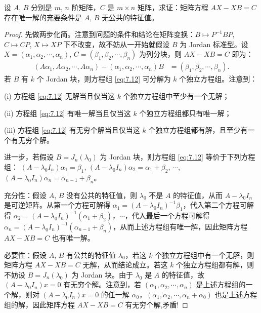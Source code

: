 \documentclass[../../main.tex]{subfiles}
\begin{document}
\begin{proposition}\label{proposition:AX-XB线性映射相关等价条件--(3)}
设 $A$, $B$ 分别是 $m$, $n$ 阶矩阵，$C$ 是 $m\times n$ 矩阵，求证：矩阵方程 $AX - XB = C$ 存在唯一解的充要条件是 $A$, $B$ 无公共的特征值。
\end{proposition}
\begin{proof}
先做两步化简。注意到问题的条件和结论在矩阵变换：$B\mapsto P^{-1}BP$, $C\mapsto CP$, $X\mapsto XP$ 下不改变，故不妨从一开始就假设 $B$ 为 Jordan 标准型。设 $X = (\alpha_1,\alpha_2,\cdots,\alpha_n)$, $C = (\beta_1,\beta_2,\cdots,\beta_n)$ 为列分块，则 $AX - XB = C$ 即为：
\begin{align}
(A\alpha_1,A\alpha_2,\cdots,A\alpha_n) - (\alpha_1,\alpha_2,\cdots,\alpha_n)B &= (\beta_1,\beta_2,\cdots,\beta_n).\label{eq:7.12}
\end{align}
若 $B$ 有 $k$ 个 Jordan 块，则方程组 \eqref{eq:7.12} 可分解为 $k$ 个独立方程组。注意到：

(i) 方程组 \eqref{eq:7.12} 无解当且仅当这 $k$ 个独立方程组中至少有一个无解；

(ii) 方程组 \eqref{eq:7.12} 有唯一解当且仅当这 $k$ 个独立方程组都只有唯一解；

(iii) 方程组 \eqref{eq:7.12} 有无穷个解当且仅当这 $k$ 个独立方程组都有解，且至少有一个有无穷个解。

进一步，若假设 $B = J_n(\lambda_0)$ 为 Jordan 块，则方程组 \eqref{eq:7.12} 等价于下列方程组：
$(A - \lambda_0I_n)\alpha_1 = \beta_1$, $(A - \lambda_0I_n)\alpha_2 = \alpha_1 + \beta_2$, $\cdots$, $(A - \lambda_0I_n)\alpha_n = \alpha_{n - 1} + \beta_n$。

{\heiti 充分性：}假设 $A$, $B$ 没有公共的特征值，则 $\lambda_0$ 不是 $A$ 的特征值，从而 $A - \lambda_0I_n$ 是可逆矩阵。从第一个方程可解得 $\alpha_1 = (A - \lambda_0I_n)^{-1}\beta_1$，代入第二个方程可解得 $\alpha_2 = (A - \lambda_0I_n)^{-1}(\alpha_1 + \beta_2)$，$\cdots$，代入最后一个方程可解得 $\alpha_n = (A - \lambda_0I_n)^{-1}(\alpha_{n - 1} + \beta_n)$，从而上述方程组有唯一解，因此矩阵方程 $AX - XB = C$ 也有唯一解。

{\heiti 必要性：}假设 $A$, $B$ 有公共的特征值 $\lambda_0$，若这 $k$ 个独立方程组中有一个无解，则矩阵方程 $AX - XB = C$ 无解，从而结论成立。若这 $k$ 个独立方程组都有解，则不妨设 $B = J_n(\lambda_0)$ 为 Jordan 块。由于 $\lambda_0$ 是 $A$ 的特征值，故 $(A - \lambda_0I_n)x = 0$ 有无穷个解。注意到，若 $(\alpha_1,\alpha_2,\cdots,\alpha_n)$ 是上述方程组的一个解，则对 $(A - \lambda_0I_n)x = 0$ 的任一解 $\alpha_0$，$(\alpha_1,\alpha_2,\cdots,\alpha_n + \alpha_0)$ 也是上述方程组的解，因此矩阵方程 $AX - XB = C$ 有无穷个解,矛盾!

\end{proof}
\end{document}
